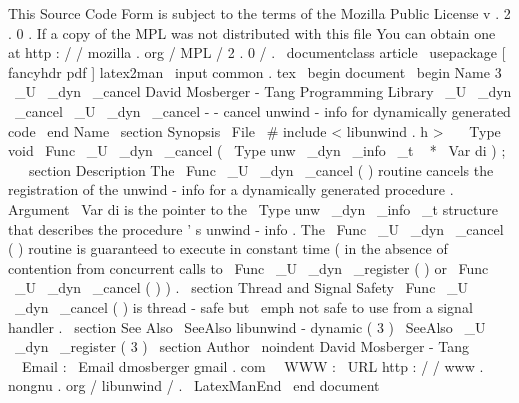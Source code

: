 %
This
Source
Code
Form
is
subject
to
the
terms
of
the
Mozilla
Public
%
License
v
.
2
.
0
.
If
a
copy
of
the
MPL
was
not
distributed
with
this
%
file
You
can
obtain
one
at
http
:
/
/
mozilla
.
org
/
MPL
/
2
.
0
/
.
\
documentclass
{
article
}
\
usepackage
[
fancyhdr
pdf
]
{
latex2man
}
\
input
{
common
.
tex
}
\
begin
{
document
}
\
begin
{
Name
}
{
3
}
{
\
_U
\
_dyn
\
_cancel
}
{
David
Mosberger
-
Tang
}
{
Programming
Library
}
{
\
_U
\
_dyn
\
_cancel
}
\
_U
\
_dyn
\
_cancel
-
-
cancel
unwind
-
info
for
dynamically
generated
code
\
end
{
Name
}
\
section
{
Synopsis
}
\
File
{
\
#
include
<
libunwind
.
h
>
}
\
\
\
Type
{
void
}
\
Func
{
\
_U
\
_dyn
\
_cancel
}
(
\
Type
{
unw
\
_dyn
\
_info
\
_t
~
*
}
\
Var
{
di
}
)
;
\
\
\
section
{
Description
}
The
\
Func
{
\
_U
\
_dyn
\
_cancel
}
(
)
routine
cancels
the
registration
of
the
unwind
-
info
for
a
dynamically
generated
procedure
.
Argument
\
Var
{
di
}
is
the
pointer
to
the
\
Type
{
unw
\
_dyn
\
_info
\
_t
}
structure
that
describes
the
procedure
'
s
unwind
-
info
.
The
\
Func
{
\
_U
\
_dyn
\
_cancel
}
(
)
routine
is
guaranteed
to
execute
in
constant
time
(
in
the
absence
of
contention
from
concurrent
calls
to
\
Func
{
\
_U
\
_dyn
\
_register
}
(
)
or
\
Func
{
\
_U
\
_dyn
\
_cancel
}
(
)
)
.
\
section
{
Thread
and
Signal
Safety
}
\
Func
{
\
_U
\
_dyn
\
_cancel
}
(
)
is
thread
-
safe
but
\
emph
{
not
}
safe
to
use
from
a
signal
handler
.
\
section
{
See
Also
}
\
SeeAlso
{
libunwind
-
dynamic
(
3
)
}
\
SeeAlso
{
\
_U
\
_dyn
\
_register
(
3
)
}
\
section
{
Author
}
\
noindent
David
Mosberger
-
Tang
\
\
Email
:
\
Email
{
dmosberger
gmail
.
com
}
\
\
WWW
:
\
URL
{
http
:
/
/
www
.
nongnu
.
org
/
libunwind
/
}
.
\
LatexManEnd
\
end
{
document
}
